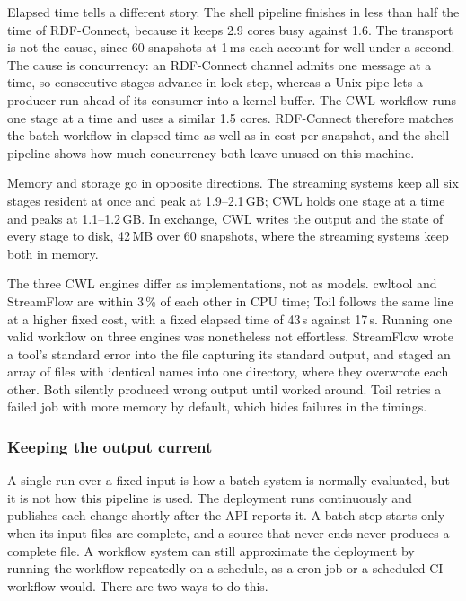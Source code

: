 Elapsed time tells a different story. The shell pipeline finishes in less than
half the time of RDF-Connect, because it keeps 2.9 cores busy against 1.6.
The transport is not the cause, since 60 snapshots at 1\,ms each account for
well under a second. The cause is concurrency: an RDF-Connect channel admits
one message at a time, so consecutive stages advance in lock-step, whereas a
Unix pipe lets a producer run ahead of its consumer into a kernel buffer. The
CWL workflow runs one stage at a time and uses a similar 1.5 cores. RDF-Connect
therefore matches the batch workflow in elapsed time as well as in cost per
snapshot, and the shell pipeline shows how much concurrency both leave unused on
this machine.

Memory and storage go in opposite directions. The streaming systems keep all six
stages resident at once and peak at 1.9--2.1\,GB; CWL holds one stage at a time
and peaks at 1.1--1.2\,GB. In exchange, CWL writes the output and the state of
every stage to disk, 42\,MB over 60 snapshots, where the streaming systems keep
both in memory.

The three CWL engines differ as implementations, not as models. cwltool and
StreamFlow are within 3\,\% of each other in CPU time; Toil follows the same
line at a higher fixed cost, with a fixed elapsed time of 43\,s against 17\,s. Running one valid
workflow on three engines was nonetheless not effortless. StreamFlow wrote a
tool's standard error into the file capturing its standard output, and staged
an array of files with identical names into one directory, where they
overwrote each other. Both silently produced wrong output until worked around.
Toil retries a failed job with more memory by default, which hides failures in
the timings.

\subsubsection{Keeping the output current}
\label{sec:eval-fresh}

A single run over a fixed input is how a batch system is normally evaluated,
but it is not how this pipeline is used. The deployment runs continuously and
publishes each change shortly after the API reports it. A batch step starts
only when its input files are complete, and a source that never ends never
produces a complete file. A workflow system can still approximate the
deployment by running the workflow repeatedly on a schedule, as a cron job or a
scheduled CI workflow would. There are two ways to do this.

